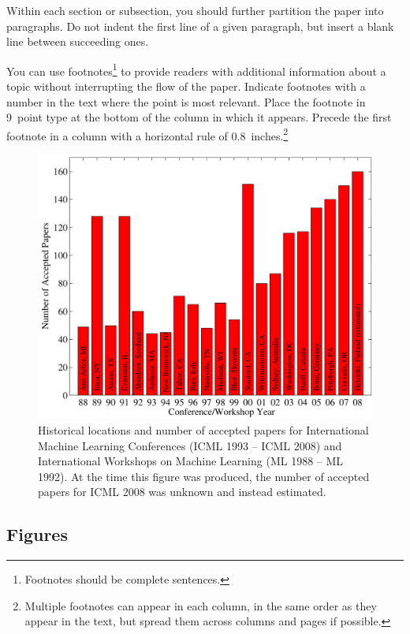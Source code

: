 \documentclass{article}
\begin{document}
Within each section or subsection, you should further partition the
paper into paragraphs. Do not indent the first line of a given
paragraph, but insert a blank line between succeeding ones.

You can use footnotes\footnote{Footnotes
should be complete sentences.} to provide readers with additional
information about a topic without interrupting the flow of the paper.
Indicate footnotes with a number in the text where the point is most
relevant. Place the footnote in 9~point type at the bottom of the
column in which it appears. Precede the first footnote in a column
with a horizontal rule of 0.8~inches.\footnote{Multiple footnotes can
appear in each column, in the same order as they appear in the text,
but spread them across columns and pages if possible.}

\begin{figure}[ht]
\vskip 0.2in
\begin{center}
\centerline{\includegraphics[width=\columnwidth]{icml_numpapers}}
\caption{Historical locations and number of accepted papers for International
Machine Learning Conferences (ICML 1993 -- ICML 2008) and International
Workshops on Machine Learning (ML 1988 -- ML 1992). At the time this figure was
produced, the number of accepted papers for ICML 2008 was unknown and instead
estimated.}
\label{icml-historical}
\end{center}
\vskip -0.2in
\end{figure}

\subsection{Figures}
\end{document}
